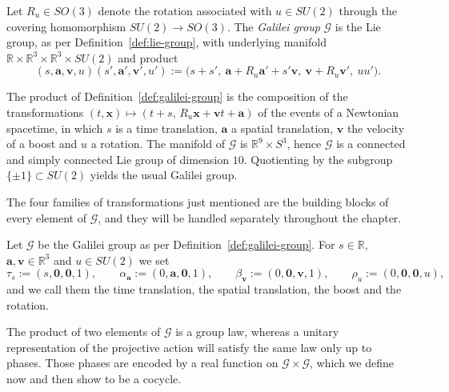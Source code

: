 \begin{definition}\label{def:galilei-group}
	Let $R_u\in SO(3)$ denote the rotation associated with $u\in SU(2)$ through the covering homomorphism $SU(2)\to SO(3)$. The \emph{Galilei group} $\mathcal{G}$ is the Lie group, as per Definition~\ref{def:lie-group}, with underlying manifold $\mathbb{R}\times\mathbb{R}^3\times\mathbb{R}^3\times SU(2)$ and product
	\begin{equation}
		(s,\mathbf{a},\mathbf{v},u)(s',\mathbf{a}',\mathbf{v}',u') := \big(s+s',\ \mathbf{a}+R_u\mathbf{a}'+s'\mathbf{v},\ \mathbf{v}+R_u\mathbf{v}',\ uu'\big).
	\end{equation}
\end{definition}

\begin{remark}
	The product of Definition~\ref{def:galilei-group} is the composition of the transformations $(t,\mathbf{x})\mapsto(t+s,\,R_u\mathbf{x}+\mathbf{v}t+\mathbf{a})$ of the events of a Newtonian spacetime, in which $s$ is a time translation, $\mathbf{a}$ a spatial translation, $\mathbf{v}$ the velocity of a boost and $u$ a rotation. The manifold of $\mathcal{G}$ is $\mathbb{R}^9\times S^3$, hence $\mathcal{G}$ is a connected and simply connected Lie group of dimension $10$. Quotienting by the subgroup $\{\pm 1\}\subset SU(2)$ yields the usual Galilei group.
\end{remark}

The four families of transformations just mentioned are the building blocks of every element of $\mathcal{G}$, and they will be handled separately throughout the chapter.

\begin{definition}\label{def:elementary-transformations}
	Let $\mathcal{G}$ be the Galilei group as per Definition~\ref{def:galilei-group}. For $s\in\mathbb{R}$, $\mathbf{a},\mathbf{v}\in\mathbb{R}^3$ and $u\in SU(2)$ we set
	\begin{equation}
		\tau_s := (s,\mathbf{0},\mathbf{0},1), \qquad \alpha_{\mathbf{a}} := (0,\mathbf{a},\mathbf{0},1), \qquad \beta_{\mathbf{v}} := (0,\mathbf{0},\mathbf{v},1), \qquad \rho_u := (0,\mathbf{0},\mathbf{0},u),
	\end{equation}
	and we call them the time translation, the spatial translation, the boost and the rotation.
\end{definition}

The product of two elements of $\mathcal{G}$ is a group law, whereas a unitary representation of the projective action will satisfy the same law only up to phases. Those phases are encoded by a real function on $\mathcal{G}\times\mathcal{G}$, which we define now and then show to be a cocycle.

